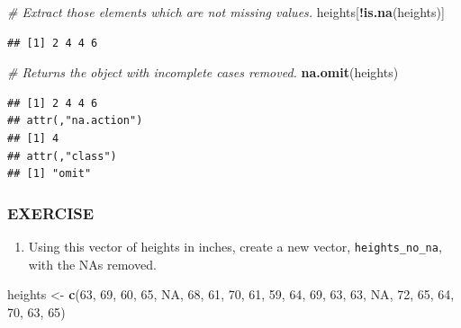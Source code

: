 \documentclass[]{book}
\newenvironment{Shaded}{\begin{snugshade}}{\end{snugshade}}
\newcommand{\CommentTok}[1]{\textcolor[rgb]{0.56,0.35,0.01}{\textit{#1}}}
\newcommand{\DecValTok}[1]{\textcolor[rgb]{0.00,0.00,0.81}{#1}}
\newcommand{\KeywordTok}[1]{\textcolor[rgb]{0.13,0.29,0.53}{\textbf{#1}}}
\newcommand{\NormalTok}[1]{#1}
\newcommand{\OperatorTok}[1]{\textcolor[rgb]{0.81,0.36,0.00}{\textbf{#1}}}
\newcommand{\OtherTok}[1]{\textcolor[rgb]{0.56,0.35,0.01}{#1}}
\newcommand{\StringTok}[1]{\textcolor[rgb]{0.31,0.60,0.02}{#1}}
\providecommand{\tightlist}{%
  \setlength{\itemsep}{0pt}\setlength{\parskip}{0pt}}
\begin{document}
\begin{Shaded}
\begin{Highlighting}[]
\CommentTok{# Extract those elements which are not missing values.}
\NormalTok{heights[}\OperatorTok{!}\KeywordTok{is.na}\NormalTok{(heights)]}
\end{Highlighting}
\end{Shaded}

\begin{verbatim}
## [1] 2 4 4 6
\end{verbatim}

\begin{Shaded}
\begin{Highlighting}[]
\CommentTok{# Returns the object with incomplete cases removed.}
\KeywordTok{na.omit}\NormalTok{(heights)}
\end{Highlighting}
\end{Shaded}

\begin{verbatim}
## [1] 2 4 4 6
## attr(,"na.action")
## [1] 4
## attr(,"class")
## [1] "omit"
\end{verbatim}

\hypertarget{exercise-8}{%
\subsubsection*{EXERCISE}\label{exercise-8}}

\begin{enumerate}
\def\labelenumi{\arabic{enumi}.}
\tightlist
\item
  Using this vector of heights in inches, create a new vector, \texttt{heights\_no\_na}, with the NAs removed.
\end{enumerate}

\begin{Shaded}
\begin{Highlighting}[]
\NormalTok{heights <-}\StringTok{ }\KeywordTok{c}\NormalTok{(}\DecValTok{63}\NormalTok{, }\DecValTok{69}\NormalTok{, }\DecValTok{60}\NormalTok{, }\DecValTok{65}\NormalTok{, }\OtherTok{NA}\NormalTok{, }\DecValTok{68}\NormalTok{, }\DecValTok{61}\NormalTok{, }\DecValTok{70}\NormalTok{, }\DecValTok{61}\NormalTok{, }\DecValTok{59}\NormalTok{, }\DecValTok{64}\NormalTok{, }\DecValTok{69}\NormalTok{, }\DecValTok{63}\NormalTok{, }\DecValTok{63}\NormalTok{, }\OtherTok{NA}\NormalTok{, }\DecValTok{72}\NormalTok{, }\DecValTok{65}\NormalTok{, }\DecValTok{64}\NormalTok{, }\DecValTok{70}\NormalTok{, }\DecValTok{63}\NormalTok{, }\DecValTok{65}\NormalTok{)}
\end{Highlighting}
\end{Shaded}
\end{document}

